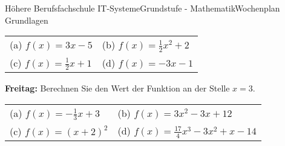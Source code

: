 \documentclass[oneside,openany,headings=optiontotoc,11pt,numbers=noenddot]{scrreprt}
\begin{document}
\begin{worksheet}{Höhere Berufsfachschule IT-Systeme}{Grundstufe - Mathematik}{Wochenplan Grundlagen}
\begin{framed}
			\begin{tabularx}{\textwidth}{XX}
				(a) \(f(x) = 3x-5\) & (b) \(f(x) = \frac{1}{2}x^2 + 2 \)\\
				(c) \(f(x) = \frac{1}{2}x +1\) & (d) \(f(x) = -3x-1\)
			\end{tabularx}
		\end{framed}
		\begin{framed}
			\noindent
			\textbf{Freitag:} Berechnen Sie den Wert der Funktion an der Stelle \(x = 3\).\\
			\begin{tabularx}{\textwidth}{XX}
				(a) \(f(x) = -\frac{1}{3}x + 3\) & (b) \(f(x) = 3x^2 - 3x + 12\)\\
				(c) \(f(x) = (x+2)^2\) & (d) \(f(x) = \frac{17}{4}x^3 - 3x^2 + x - 14\)
			\end{tabularx}
		\end{framed}
	\end{worksheet}
\end{document}
